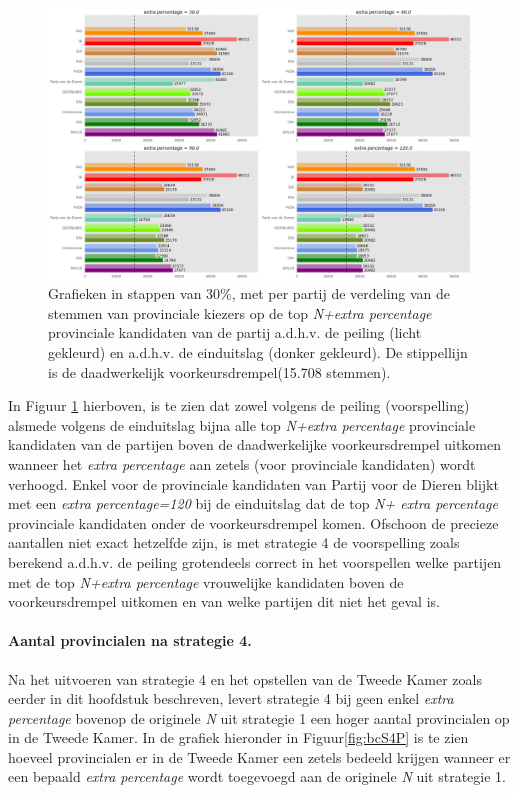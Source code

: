  
\begin{figure}[H]

	\includegraphics[width=\linewidth]	{stemmen_op_provincialen_topNextrapercentage_uitslag.png}

			\caption{Grafieken in stappen van 30\%, met per partij de verdeling van de stemmen van provinciale kiezers op de top \textit{N+extra percentage} provinciale kandidaten van de partij a.d.h.v. de peiling (licht gekleurd) en a.d.h.v. de einduitslag (donker gekleurd). De stippellijn is de daadwerkelijk voorkeursdrempel(15.708 stemmen).}

\label{fig:stemmenS4P}
\end{figure}

In Figuur \ref{fig:stemmenS4P}  hierboven, is te zien dat zowel volgens de peiling (voorspelling) alsmede volgens de einduitslag bijna alle top \textit{N+extra percentage} provinciale kandidaten van de partijen boven de daadwerkelijke voorkeursdrempel uitkomen wanneer het \textit{extra percentage} aan zetels (voor provinciale kandidaten) wordt verhoogd. Enkel voor de provinciale kandidaten van Partij voor de Dieren blijkt met een \textit{extra percentage=120} bij de einduitslag dat de top \textit{N+ extra percentage} provinciale kandidaten onder de voorkeursdrempel komen. Ofschoon de precieze aantallen niet exact hetzelfde zijn, is met strategie 4 de voorspelling zoals berekend a.d.h.v. de peiling grotendeels correct in het voorspellen welke partijen met de top \textit{N+extra percentage} vrouwelijke kandidaten boven de voorkeursdrempel uitkomen en van welke partijen dit niet het geval is.



\paragraph{Aantal provincialen na strategie 4.}
Na het uitvoeren van strategie 4 en het opstellen van de Tweede Kamer zoals eerder in dit hoofdstuk beschreven, levert strategie 4 bij geen enkel \textit{extra percentage} bovenop de originele \textit{N} uit strategie 1 een hoger aantal provincialen op in de Tweede Kamer. In de grafiek hieronder in Figuur\ref{fig:bcS4P} is te zien hoeveel provincialen er in de Tweede Kamer een zetels bedeeld krijgen wanneer er een bepaald \textit{extra percentage} wordt toegevoegd aan de originele \textit{N} uit strategie 1.

